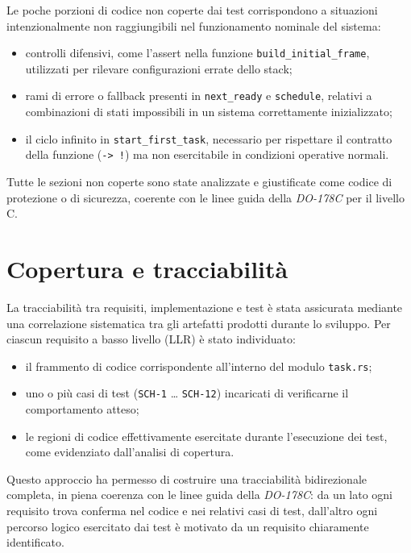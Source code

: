 \documentclass[italian, Lau, oneside]{sapthesis} %
\begin{document}
Le poche porzioni di codice non coperte dai test corrispondono a situazioni intenzionalmente non raggiungibili nel funzionamento nominale del sistema:

\begin{itemize}
    \item controlli difensivi, come l'assert nella funzione \texttt{build\_initial\_frame}, utilizzati per rilevare configurazioni errate dello stack;
    \item rami di errore o fallback presenti in \texttt{next\_ready} e \texttt{schedule}, relativi a combinazioni di stati impossibili in un sistema correttamente inizializzato;
    \item il ciclo infinito in \texttt{start\_first\_task}, necessario per rispettare il contratto della funzione (\texttt{-> !}) ma non esercitabile in condizioni operative normali.
\end{itemize}

Tutte le sezioni non coperte sono state analizzate e giustificate come codice di protezione o di sicurezza, coerente con le linee guida della \textit{DO-178C} per il livello C.

\section{Copertura e tracciabilità}

La tracciabilità tra requisiti, implementazione e test è stata assicurata mediante una correlazione sistematica tra gli artefatti prodotti durante lo sviluppo. Per ciascun requisito a basso livello (LLR) è stato individuato:

\begin{itemize}
    \item il frammento di codice corrispondente all’interno del modulo \texttt{task.rs};
    \item uno o più casi di test (\texttt{SCH-1} … \texttt{SCH-12}) incaricati di verificarne il comportamento atteso;
    \item le regioni di codice effettivamente esercitate durante l’esecuzione dei test, come evidenziato dall’analisi di copertura.
\end{itemize}

Questo approccio ha permesso di costruire una tracciabilità bidirezionale completa, in piena coerenza con le linee guida della \textit{DO-178C}: da un lato ogni requisito trova conferma nel codice e nei relativi casi di test, dall’altro ogni percorso logico esercitato dai test è motivato da un requisito chiaramente identificato.
\end{document}

